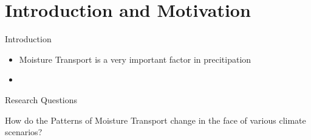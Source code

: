 \section[Intro]{Introduction and Motivation}
\begin{frame}{Introduction}

\begin{itemize}
  \item Moisture Transport is a very important factor in precitipation 
  \item 
  
\end{itemize}

\end{frame}

\begin{frame}{Research Questions}
  
\bullet How do the Patterns of Moisture Transport change in the face of various climate scenarios?

\end{frame}
